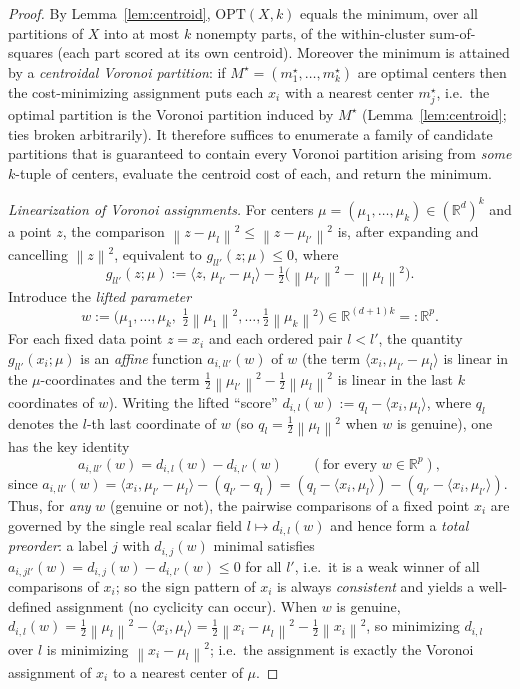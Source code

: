 \documentclass{amsart}
\theoremstyle{plain}
\theoremstyle{definition}
\newcommand{\R}{\mathbb{R}}
\newcommand{\norm}[1]{\left\lVert #1 \right\rVert}
\begin{document}
\begin{proof}
By Lemma~\ref{lem:centroid}, $\mathrm{OPT}(X,k)$ equals the minimum, over all
partitions of $X$ into at most $k$ nonempty parts, of the within-cluster
sum-of-squares (each part scored at its own centroid). Moreover the minimum is
attained by a \emph{centroidal Voronoi partition}: if $M^{\star}=(m_{1}^{\star},
\dots,m_{k}^{\star})$ are optimal centers then the cost-minimizing assignment puts
each $x_{i}$ with a nearest center $m_{j}^{\star}$, i.e.\ the optimal partition is
the Voronoi partition induced by $M^{\star}$ (Lemma~\ref{lem:centroid}; ties broken
arbitrarily). It therefore suffices to enumerate a family of candidate partitions
that is guaranteed to contain every Voronoi partition arising from \emph{some}
$k$-tuple of centers, evaluate the centroid cost of each, and return the minimum.

\emph{Linearization of Voronoi assignments.} For centers
$\mu=(\mu_{1},\dots,\mu_{k})\in(\R^{d})^{k}$ and a point $z$, the comparison
$\norm{z-\mu_{l}}^{2}\le\norm{z-\mu_{l'}}^{2}$ is, after expanding and cancelling
$\norm{z}^{2}$, equivalent to $g_{ll'}(z;\mu)\le 0$, where
\[
g_{ll'}(z;\mu):=\langle z,\,\mu_{l'}-\mu_{l}\rangle
-\tfrac12\big(\norm{\mu_{l'}}^{2}-\norm{\mu_{l}}^{2}\big).
\]
Introduce the \emph{lifted parameter}
\[
w:=\big(\mu_{1},\dots,\mu_{k},\;\tfrac12\norm{\mu_{1}}^{2},\dots,\tfrac12\norm{\mu_{k}}^{2}\big)
\in\R^{(d+1)k}=:\R^{p}.
\]
For each fixed data point $z=x_{i}$ and each ordered pair $l<l'$, the quantity
$g_{ll'}(x_{i};\mu)$ is an \emph{affine} function $a_{i,ll'}(w)$ of $w$ (the term
$\langle x_i,\mu_{l'}-\mu_l\rangle$ is linear in the $\mu$-coordinates and the term
$\tfrac12\norm{\mu_{l'}}^{2}-\tfrac12\norm{\mu_{l}}^{2}$ is linear in the last $k$
coordinates of $w$). Writing the lifted ``score''
$d_{i,l}(w):=q_l-\langle x_i,\mu_l\rangle$, where $q_l$ denotes the $l$-th
last coordinate of $w$ (so $q_l=\tfrac12\norm{\mu_l}^2$ when $w$ is genuine), one
has the key identity
\begin{equation}\label{eq:scorefield}
a_{i,ll'}(w)=d_{i,l}(w)-d_{i,l'}(w)\qquad(\text{for every }w\in\R^p),
\end{equation}
since $a_{i,ll'}(w)=\langle x_i,\mu_{l'}-\mu_l\rangle-(q_{l'}-q_l)
=(q_l-\langle x_i,\mu_l\rangle)-(q_{l'}-\langle x_i,\mu_{l'}\rangle)$.
Thus, for \emph{any} $w$ (genuine or not), the pairwise comparisons of a fixed
point $x_i$ are governed by the single real scalar field $l\mapsto d_{i,l}(w)$ and
hence form a \emph{total preorder}: a label $j$ with $d_{i,j}(w)$ minimal satisfies
$a_{i,jl'}(w)=d_{i,j}(w)-d_{i,l'}(w)\le 0$ for all $l'$, i.e.\ it is a weak winner
of all comparisons of $x_i$; so the sign pattern of $x_i$ is always
\emph{consistent} and yields a well-defined assignment (no cyclicity can occur).
When $w$ is genuine, $d_{i,l}(w)=\tfrac12\norm{\mu_l}^2-\langle x_i,\mu_l\rangle
=\tfrac12\norm{x_i-\mu_l}^2-\tfrac12\norm{x_i}^2$, so minimizing $d_{i,l}$ over $l$
is minimizing $\norm{x_i-\mu_l}^2$; i.e.\ the assignment is exactly the Voronoi
assignment of $x_i$ to a nearest center of $\mu$.


\end{proof}
\end{document}
